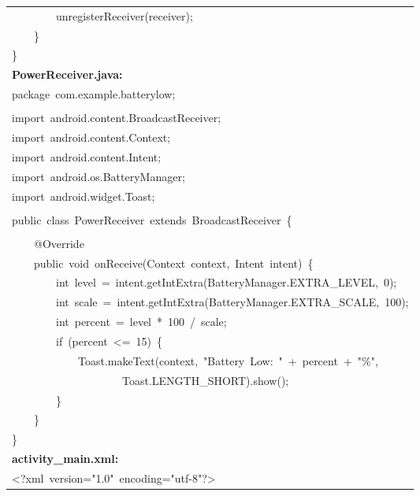 \documentclass[a4paper,12pt]{article}
\begin{document}
\begin{longtable}{|p{}|}
{\ttfamily\small \ \ \ \ \ \ \ \ unregisterReceiver(receiver);} \\
{\ttfamily\small \ \ \ \ \}} \\
{\ttfamily\small \}} \\
\hline
\rule{0pt}{13pt}\textbf{PowerReceiver.java:} \\
\hline
{\ttfamily\small package\ com.example.batterylow;} \\
\strut \\
{\ttfamily\small import\ android.content.BroadcastReceiver;} \\
{\ttfamily\small import\ android.content.Context;} \\
{\ttfamily\small import\ android.content.Intent;} \\
{\ttfamily\small import\ android.os.BatteryManager;} \\
{\ttfamily\small import\ android.widget.Toast;} \\
\strut \\
{\ttfamily\small public\ class\ PowerReceiver\ extends\ BroadcastReceiver\ \{} \\
\strut \\
{\ttfamily\small \ \ \ \ @Override} \\
{\ttfamily\small \ \ \ \ public\ void\ onReceive(Context\ context,\ Intent\ intent)\ \{} \\
{\ttfamily\small \ \ \ \ \ \ \ \ int\ level\ =\ intent.getIntExtra(BatteryManager.EXTRA\_LEVEL,\ 0);} \\
{\ttfamily\small \ \ \ \ \ \ \ \ int\ scale\ =\ intent.getIntExtra(BatteryManager.EXTRA\_SCALE,\ 100);} \\
{\ttfamily\small \ \ \ \ \ \ \ \ int\ percent\ =\ level\ *\ 100\ /\ scale;} \\
{\ttfamily\small \ \ \ \ \ \ \ \ if\ (percent\ \textless{}=\ 15)\ \{} \\
{\ttfamily\small \ \ \ \ \ \ \ \ \ \ \ \ Toast.makeText(context,\ "Battery\ Low:\ "\ +\ percent\ +\ "\%",\ } \\
{\ttfamily\small \ \ \ \ \ \ \ \ \ \ \ \ \ \ \ \ \ \ \ \ Toast.LENGTH\_SHORT).show();} \\
{\ttfamily\small \ \ \ \ \ \ \ \ \}} \\
{\ttfamily\small \ \ \ \ \}} \\
{\ttfamily\small \}} \\
\hline
\rule{0pt}{13pt}\textbf{activity\_main.xml:} \\
\hline
{\ttfamily\small \textless{}?xml\ version="1.0"\ encoding="utf-8"?\textgreater{}} \\

\end{longtable}
\end{document}
